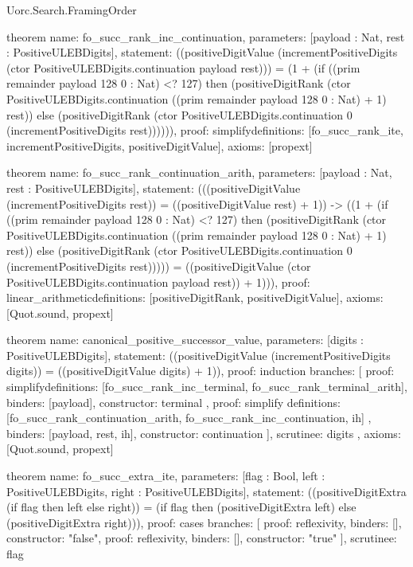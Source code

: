 \begin{lexlean}{Uorc.Search.FramingOrder}
\begin{semanticmodule}
theorem{
  name: fo_succ_rank_inc_continuation,
  parameters: [payload : Nat, rest : PositiveULEBDigits],
  statement: ((positiveDigitValue (incrementPositiveDigits (ctor PositiveULEBDigits.continuation payload rest))) = (1 + (if ((prim remainder payload 128 0 : Nat) <? 127) then (positiveDigitRank (ctor PositiveULEBDigits.continuation ((prim remainder payload 128 0 : Nat) + 1) rest)) else (positiveDigitRank (ctor PositiveULEBDigits.continuation 0 (incrementPositiveDigits rest)))))),
  proof: simplify{definitions: [fo_succ_rank_ite, incrementPositiveDigits, positiveDigitValue]},
  axioms: [propext]
}

theorem{
  name: fo_succ_rank_continuation_arith,
  parameters: [payload : Nat, rest : PositiveULEBDigits],
  statement: (((positiveDigitValue (incrementPositiveDigits rest)) = ((positiveDigitValue rest) + 1)) -> ((1 + (if ((prim remainder payload 128 0 : Nat) <? 127) then (positiveDigitRank (ctor PositiveULEBDigits.continuation ((prim remainder payload 128 0 : Nat) + 1) rest)) else (positiveDigitRank (ctor PositiveULEBDigits.continuation 0 (incrementPositiveDigits rest))))) = ((positiveDigitValue (ctor PositiveULEBDigits.continuation payload rest)) + 1))),
  proof: linear_arithmetic{definitions: [positiveDigitRank, positiveDigitValue]},
  axioms: [Quot.sound, propext]
}

theorem{
  name: canonical_positive_successor_value,
  parameters: [digits : PositiveULEBDigits],
  statement: ((positiveDigitValue (incrementPositiveDigits digits)) = ((positiveDigitValue digits) + 1)),
  proof: induction{
    branches: [
      {
        proof: simplify{definitions: [fo_succ_rank_inc_terminal, fo_succ_rank_terminal_arith]},
        binders: [payload],
        constructor: terminal
      },
      {
        proof: simplify{
          definitions: [fo_succ_rank_continuation_arith, fo_succ_rank_inc_continuation, ih]
        },
        binders: [payload, rest, ih],
        constructor: continuation
      }
    ],
    scrutinee: digits
  },
  axioms: [Quot.sound, propext]
}

theorem{
  name: fo_succ_extra_ite,
  parameters: [flag : Bool, left : PositiveULEBDigits, right : PositiveULEBDigits],
  statement: ((positiveDigitExtra (if flag then left else right)) = (if flag then (positiveDigitExtra left) else (positiveDigitExtra right))),
  proof: cases{
    branches: [
      {proof: reflexivity{}, binders: [], constructor: "false"},
      {proof: reflexivity{}, binders: [], constructor: "true"}
    ],
    scrutinee: flag
  }
}


\end{semanticmodule}
\end{lexlean}
